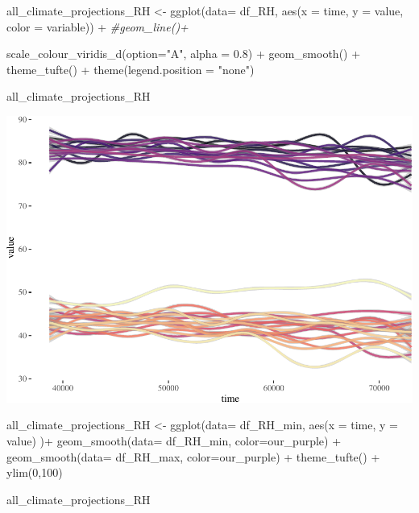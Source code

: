 \documentclass[
  paper=a4,
  ,captions=tableheading
]{scrartcl}
\newenvironment{Shaded}{\begin{snugshade}}{\end{snugshade}}
\newcommand{\AttributeTok}[1]{\textcolor[rgb]{0.77,0.63,0.00}{#1}}
\newcommand{\CommentTok}[1]{\textcolor[rgb]{0.56,0.35,0.01}{\textit{#1}}}
\newcommand{\DecValTok}[1]{\textcolor[rgb]{0.00,0.00,0.81}{#1}}
\newcommand{\FloatTok}[1]{\textcolor[rgb]{0.00,0.00,0.81}{#1}}
\newcommand{\FunctionTok}[1]{\textcolor[rgb]{0.00,0.00,0.00}{#1}}
\newcommand{\NormalTok}[1]{#1}
\newcommand{\OtherTok}[1]{\textcolor[rgb]{0.56,0.35,0.01}{#1}}
\newcommand{\SpecialCharTok}[1]{\textcolor[rgb]{0.00,0.00,0.00}{#1}}
\newcommand{\StringTok}[1]{\textcolor[rgb]{0.31,0.60,0.02}{#1}}
\begin{document}
\begin{Shaded}
\begin{Highlighting}[]
\NormalTok{all\_climate\_projections\_RH }\OtherTok{\textless{}{-}} \FunctionTok{ggplot}\NormalTok{(}\AttributeTok{data=}\NormalTok{ df\_RH, }\FunctionTok{aes}\NormalTok{(}\AttributeTok{x =}\NormalTok{ time, }\AttributeTok{y =}\NormalTok{ value, }\AttributeTok{color =}\NormalTok{ variable)) }\SpecialCharTok{+} 
  \CommentTok{\#geom\_line()+}
  
  \FunctionTok{scale\_colour\_viridis\_d}\NormalTok{(}\AttributeTok{option=}\StringTok{"A"}\NormalTok{, }\AttributeTok{alpha =} \FloatTok{0.8}\NormalTok{) }\SpecialCharTok{+}
  \FunctionTok{geom\_smooth}\NormalTok{() }\SpecialCharTok{+}
  \FunctionTok{theme\_tufte}\NormalTok{() }\SpecialCharTok{+}
  \FunctionTok{theme}\NormalTok{(}\AttributeTok{legend.position =} \StringTok{"none"}\NormalTok{) }
  

\NormalTok{all\_climate\_projections\_RH}
\end{Highlighting}
\end{Shaded}

\includegraphics{Haskell_files/figure-latex/unnamed-chunk-42-1.pdf}

\begin{Shaded}
\begin{Highlighting}[]
\NormalTok{all\_climate\_projections\_RH }\OtherTok{\textless{}{-}} \FunctionTok{ggplot}\NormalTok{(}\AttributeTok{data=}\NormalTok{ df\_RH\_min, }\FunctionTok{aes}\NormalTok{(}\AttributeTok{x =}\NormalTok{ time, }\AttributeTok{y =}\NormalTok{ value) )}\SpecialCharTok{+} 
  \FunctionTok{geom\_smooth}\NormalTok{(}\AttributeTok{data=}\NormalTok{ df\_RH\_min, }\AttributeTok{color=}\NormalTok{our\_purple) }\SpecialCharTok{+}
  \FunctionTok{geom\_smooth}\NormalTok{(}\AttributeTok{data=}\NormalTok{ df\_RH\_max, }\AttributeTok{color=}\NormalTok{our\_purple) }\SpecialCharTok{+}
  \FunctionTok{theme\_tufte}\NormalTok{() }\SpecialCharTok{+}
  \FunctionTok{ylim}\NormalTok{(}\DecValTok{0}\NormalTok{,}\DecValTok{100}\NormalTok{)}
  

\NormalTok{all\_climate\_projections\_RH}
\end{Highlighting}
\end{Shaded}
\end{document}
